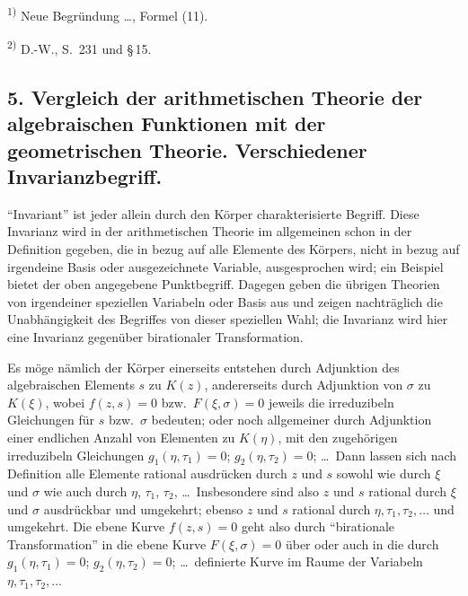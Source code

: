 \documentclass[12pt,a4paper]{article}
\begin{document}
\smallskip
\noindent\textsuperscript{1)} Neue Begr\"undung \ldots, Formel (11).

\smallskip
\noindent\textsuperscript{2)} D.-W., S.\ 231 und \S\,15.

\subsection*{5. Vergleich der arithmetischen Theorie der algebraischen Funktionen mit der geometrischen Theorie. Verschiedener Invarianzbegriff.}

``Invariant'' ist jeder allein durch den K\"orper charakterisierte Begriff. Diese Invarianz wird in der arithmetischen Theorie im allgemeinen schon in der Definition gegeben, die in bezug auf alle Elemente des K\"orpers, nicht in bezug auf irgendeine Basis oder ausgezeichnete Variable, ausgesprochen wird; ein Beispiel bietet der oben angegebene Punktbegriff. Dagegen geben die \"ubrigen Theorien von irgendeiner speziellen Variabeln oder Basis aus und zeigen nachtr\"aglich die Unabh\"angigkeit des Begriffes von dieser speziellen Wahl; die Invarianz wird hier eine Invarianz gegen\"uber birationaler Transformation.

Es m\"oge n\"amlich der K\"orper einerseits entstehen durch Adjunktion des algebraischen Elements $s$ zu $K(z)$, andererseits durch Adjunktion von $\sigma$ zu $K(\xi)$, wobei $f(z,s)=0$ bzw.\ $F(\xi,\sigma)=0$ jeweils die irreduzibeln Gleichungen f\"ur $s$ bzw.\ $\sigma$ bedeuten; oder noch allgemeiner durch Adjunktion einer endlichen Anzahl von Elementen zu $K(\eta)$, mit den zugeh\"origen irreduzibeln Gleichungen $g_{1}(\eta,\tau_{1})=0$; $g_{2}(\eta,\tau_{2})=0$; \ldots{}\ Dann lassen sich nach Definition alle Elemente rational ausdr\"ucken durch $z$ und $s$ sowohl wie durch $\xi$ und $\sigma$ wie auch durch $\eta$, $\tau_{1}$, $\tau_{2}$, \ldots{}\ Insbesondere sind also $z$ und $s$ rational durch $\xi$ und $\sigma$ ausdr\"uckbar und umgekehrt; ebenso $z$ und $s$ rational durch $\eta,\tau_{1},\tau_{2},\ldots$ und umgekehrt. Die ebene Kurve $f(z,s)=0$ geht also durch ``birationale Transformation'' in die ebene Kurve $F(\xi,\sigma)=0$ \"uber oder auch in die durch $g_{1}(\eta,\tau_{1})=0$; $g_{2}(\eta,\tau_{2})=0$; \ldots{}\ definierte Kurve im Raume der Variabeln $\eta,\tau_{1},\tau_{2},\ldots$
\end{document}
